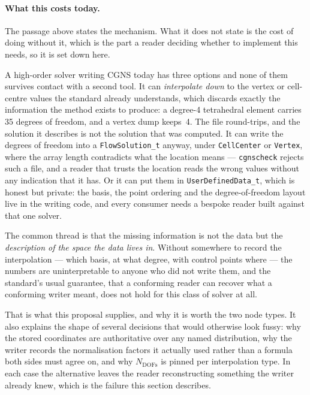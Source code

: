 \documentclass[11pt,letterpaper]{article}
\newif\ifvfourdraft
\newenvironment{v4block}{\ifvfourdraft\color{v4violet}\fi\ignorespaces}{\par}
\newcommand{\vfourmark}{\ifvfourdraft\textcolor{v4violet}{\textbf{[v4]}}\ \fi}
\begin{document}
\begin{v4block}
\paragraph{\vfourmark What this costs today.}
The passage above states the mechanism.  What it does not state is the cost of
doing without it, which is the part a reader deciding whether to implement this
needs, so it is set down here.

A high-order solver writing CGNS today has three options and none of them
survives contact with a second tool.  It can \emph{interpolate down} to the
vertex or cell-centre values the standard already understands, which discards
exactly the information the method exists to produce: a degree-4 tetrahedral
element carries 35 degrees of freedom, and a vertex dump keeps~4.  The file
round-trips, and the solution it describes is not the solution that was
computed.  It can write the degrees of freedom into a \texttt{FlowSolution\_t}
anyway, under \texttt{CellCenter} or \texttt{Vertex}, where the array length
contradicts what the location means --- \texttt{cgnscheck} rejects such a file,
and a reader that trusts the location reads the wrong values without any
indication that it has.  Or it can put them in \texttt{UserDefinedData\_t},
which is honest but private: the basis, the point ordering and the
degree-of-freedom layout live in the writing code, and every consumer needs a
bespoke reader built against that one solver.

The common thread is that the missing information is not the data but the
\emph{description of the space the data lives in}.  Without somewhere to record
the interpolation --- which basis, at what degree, with control points where ---
the numbers are uninterpretable to anyone who did not write them, and the
standard's usual guarantee, that a conforming reader can recover what a
conforming writer meant, does not hold for this class of solver at all.

That is what this proposal supplies, and why it is worth the two node types.
It also explains the shape of several decisions that would otherwise look
fussy: why the stored coordinates are authoritative over any named
distribution, why the writer records the normalisation factors it actually
used rather than a formula both sides must agree on, and why $N_\mathrm{DOFs}$
is pinned per interpolation type.  In each case the alternative leaves the
reader reconstructing something the writer already knew, which is the failure
this section describes.
\end{v4block}
\end{document}
